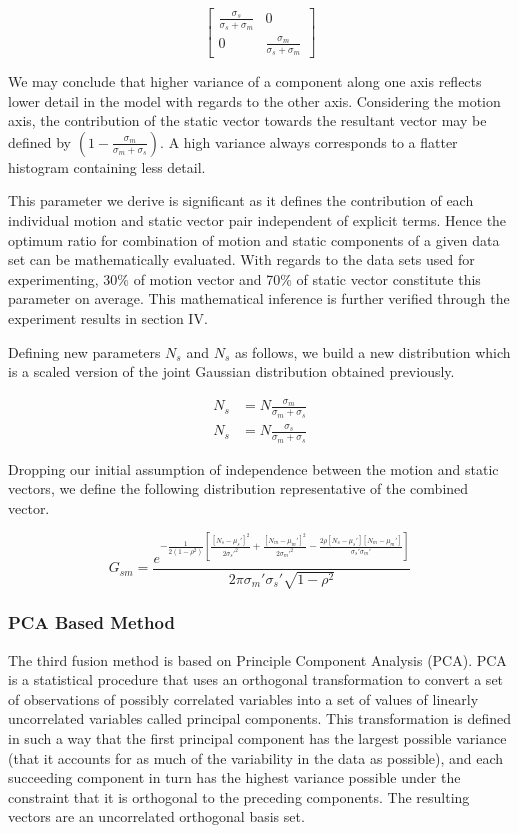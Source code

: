 \[
\begin{bmatrix}
    \frac {\sigma_s}{\sigma_s + \sigma_m} & 0  \\
    0 & \frac {\sigma_m}{\sigma_s + \sigma_m}
\end{bmatrix}
\]

We may conclude that higher variance of a component along one axis reflects lower detail in the model with regards to the other axis. Considering the motion axis, the contribution of the static vector towards the resultant vector may be defined by $(1-\frac{\sigma_m}{\sigma_m+\sigma_s})$. A high variance always corresponds to a flatter histogram containing less detail.

This parameter we derive is significant as it defines the contribution of each individual motion and static vector pair independent of explicit terms. Hence the optimum ratio for combination of motion and static components of a given data set can be mathematically evaluated. With regards to the data sets used for experimenting, 30\% of motion
vector and 70\% of static vector constitute this parameter on average. This mathematical inference is further verified through the experiment results in section IV.

Defining new parameters $N_s$ and $N_s$ as follows, we build a new distribution which is a scaled version of the joint Gaussian distribution obtained previously.

\begin{align*}
N_s &= N \frac{\sigma_m}{\sigma_m+\sigma_s}  \\
N_s &= N \frac{\sigma_s}{\sigma_m+\sigma_s}
\end{align*}

Dropping our initial assumption of independence between the motion and static vectors, we define the following distribution representative of the combined vector.

\begin{equation}
G_{sm}= \frac{e^{-\frac{1}{2(1-\rho^2)}\left[\frac{[N_s-\mu_s']^2}{2\sigma_s'^2} + \frac{[N_m-\mu_m']^2}{2\sigma_m'^2} - \frac{2\rho[N_s-\mu_s'][N_m-\mu_m']}{\sigma_s' \sigma_m'}  \right]}}{2\pi\sigma_m'\sigma_s'\sqrt{1-\rho^2}}
\end{equation}

\subsubsection{PCA Based Method}

The third fusion method is based on Principle Component Analysis (PCA). PCA is a statistical procedure that uses an orthogonal transformation to convert a
set of observations of possibly correlated variables into a set of values of linearly uncorrelated
variables called principal components. This transformation is defined in such a way that the first
principal component has the largest possible variance (that it accounts for as much of the
variability in the data as possible), and each succeeding component in turn has the highest
variance possible under the constraint that it is orthogonal to the preceding components. The
resulting vectors are an uncorrelated orthogonal basis set.


